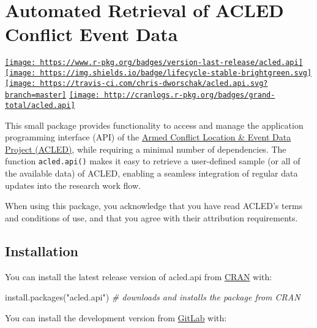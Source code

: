 \documentclass[
]{article}
\author{}
\date{\vspace{-2.5em}}
\newenvironment{Shaded}{\begin{snugshade}}{\end{snugshade}}
\newcommand{\CommentTok}[1]{\textcolor[rgb]{0.56,0.35,0.01}{\textit{#1}}}
\newcommand{\FunctionTok}[1]{\textcolor[rgb]{0.00,0.00,0.00}{#1}}
\newcommand{\NormalTok}[1]{#1}
\newcommand{\StringTok}[1]{\textcolor[rgb]{0.31,0.60,0.02}{#1}}
\begin{document}
\hypertarget{automated-retrieval-of-acled-conflict-event-data}{%
\section{Automated Retrieval of ACLED Conflict Event
Data}\label{automated-retrieval-of-acled-conflict-event-data}}

\href{https://CRAN.R-project.org/package=acled.api/}{\texttt{[image: https://www.r-pkg.org/badges/version-last-release/acled.api]}}
\href{https://lifecycle.r-lib.org/articles/stages.html\#stable/}{\texttt{[image: https://img.shields.io/badge/lifecycle-stable-brightgreen.svg]}}
\href{https://travis-ci.com/gitlab/chris-dworschak/acled.api/}{\texttt{[image: https://travis-ci.com/chris-dworschak/acled.api.svg?branch=master]}}
\href{https://CRAN.R-project.org/package=acled.api/}{\texttt{[image: http://cranlogs.r-pkg.org/badges/grand-total/acled.api]}}

This small package provides functionality to access and manage the
application programming interface (API) of the
\href{https://acleddata.com/}{Armed Conflict Location \& Event Data
Project (ACLED)}, while requiring a minimal number of dependencies. The
function \texttt{acled.api()} makes it easy to retrieve a user-defined
sample (or all of the available data) of ACLED, enabling a seamless
integration of regular data updates into the research work flow.

When using this package, you acknowledge that you have read ACLED's
terms and conditions of use, and that you agree with their attribution
requirements.

\hypertarget{installation}{%
\subsection{Installation}\label{installation}}

You can install the latest release version of acled.api from
\href{https://CRAN.R-project.org/package=acled.api/}{CRAN} with:

\begin{Shaded}
\begin{Highlighting}[]
\FunctionTok{install.packages}\NormalTok{(}\StringTok{"acled.api"}\NormalTok{) }\CommentTok{\# downloads and installs the package from CRAN}
\end{Highlighting}
\end{Shaded}

You can install the development version from
\href{https://gitlab.com/chris-dworschak/}{GitLab} with:
\end{document}
